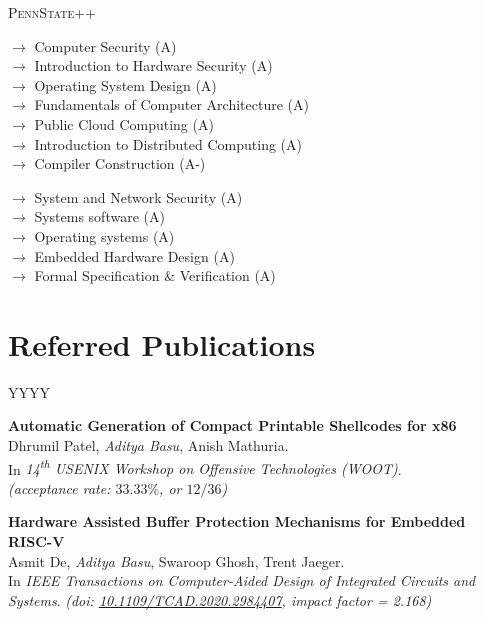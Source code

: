\documentclass[margin]{res}
\newcommand{\daiict}{\textsc{DAIICT}}
\newcommand{\psu}{\textsc{PennState}}
\newcommand{\doi}[1]{\href{http://dx.doi.org/#1}{#1}}
\begin{document}
\begin{resume}
\begin{labeling}{\psu++}

\item[{\bfseries\psu}]
	$\longrightarrow$ Computer Security (A)\\
	$\longrightarrow$ Introduction to Hardware Security (A)\\
	$\longrightarrow$ Operating System Design (A)\\
	$\longrightarrow$ Fundamentals of Computer Architecture (A)\\
	$\longrightarrow$ Public Cloud Computing (A)\\
	$\longrightarrow$ Introduction to Distributed Computing (A)\\
	$\longrightarrow$ Compiler Construction (A-)\\[2ex]

\item[{\bfseries\daiict}]
	$\longrightarrow$ System and Network Security (A)\\
	$\longrightarrow$ Systems software (A)\\
	$\longrightarrow$ Operating systems (A)\\
	$\longrightarrow$ Embedded Hardware Design (A)\\
	$\longrightarrow$ Formal Specification \& Verification (A)

\end{labeling}

\section{Referred Publications}

\begin{labeling}{YYYY}
\item[2020]
    \textbf{Automatic Generation of Compact Printable Shellcodes for x86}\\
    Dhrumil Patel, \emph{Aditya Basu}, Anish Mathuria.\\
    In \emph{14\textsuperscript{th} USENIX Workshop on Offensive Technologies ({WOOT})}.\\
    {\itshape (acceptance rate: $33.33\%$, or $12/36$)}

\item[2020]
    \textbf{Hardware Assisted Buffer Protection Mechanisms for Embedded RISC-V}\\
    Asmit De, \emph{Aditya Basu}, Swaroop Ghosh, Trent Jaeger.\\
    In \emph{IEEE Transactions on Computer-Aided Design of Integrated Circuits and Systems}.
    {\itshape (doi: \doi{10.1109/TCAD.2020.2984407}, impact factor = 2.168)}


\end{labeling}
\end{resume}
\end{document}

